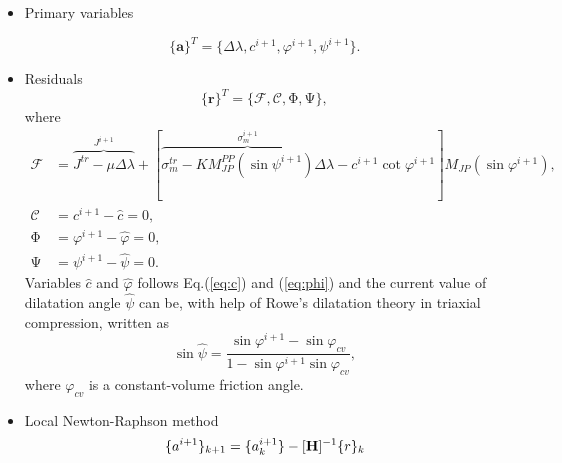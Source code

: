 \begin{itemize}
	\item Primary variables
	
	\begin{equation}
		\lbrace \mathbf{a} \rbrace ^T = \lbrace \Delta \lambda, c^{i+1}, \varphi^{i+1}, \psi^{i+1} \rbrace.
	\end{equation}
	
	\item Residuals
	\begin{equation}
		\lbrace \mathbf{r} \rbrace^T =  \lbrace \mathcal{F}, \mathcal{C}, \mathrm{\Phi}, \mathrm{\Psi} \rbrace,
	\end{equation}
	where \begin{align}
		\mathcal{F} &= \overbrace{J^{tr}-\mu\Delta\lambda}^{J^{i+1}} + [\overbrace{\sigma_m^{tr}-K M_{JP}^{PP}(\sin \psi^{i+1})\Delta\lambda}^{\sigma_m^{i+1}}-c^{i+1}\cot\varphi^{i+1}]M_{JP}(\sin\varphi^{i+1}),\label{eq:f_yc_lam}\\
		\mathcal{C} &= c^{i+1} - \hat{c} = 0,\label{eq:C_jac}\\
		\mathrm{\Phi} &= \varphi^{i+1} - \hat{\varphi} = 0,\label{eq:phi_jac}\\
		\mathrm{\Psi} &= \psi^{i+1} - \hat{\psi} = 0.
	\end{align}
	Variables $\hat{c}$ and $\hat{\varphi}$ follows Eq.(\ref{eq:c}) and (\ref{eq:phi}) and the current value of dilatation angle $\hat{\psi}$ can be, with help of Rowe's dilatation theory in triaxial compression, written as
	\begin{equation}
		\sin \hat{\psi} = \dfrac{\sin \varphi^{i+1} - \sin \varphi_{cv}}{1 - \sin \varphi^{i+1} \sin \varphi_{cv}},
	\end{equation}
	where $\varphi_{cv}$ is a constant-volume friction angle.
	
	\item Local Newton-Raphson method
	\begin{equation}\label{eq:newton_raphson}
		\lbrace a^{i+1} \rbrace _{k+1} = \lbrace a^{i+1}_k \rbrace - [\text{\textbf{H}}]^{-1} \lbrace r \rbrace_k 
	\end{equation}
	

\end{itemize}
